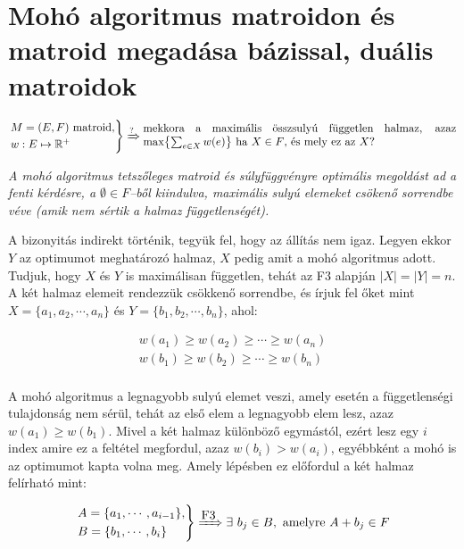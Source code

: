 \section{Mohó algoritmus matroidon és matroid megadása bázissal, duális matroidok}

\[
	\begin{rcases}
		M=(E,F) \mbox{ matroid}, \\
		w : E \mapsto \mathbb{R}^+
	\end{rcases}
	\xRightarrow{?} \parbox[L]{9.8cm}{mekkora a maximális összsulyú független halmaz,
		azaz max$\left\{\sum_{e \in X}w(e)\right\}$ ha $X \in F$, és mely ez az $X$?}
\]

\vspace{0.4cm}
\emph{A mohó algoritmus tetszőleges matroid és súlyfüggvényre optimális
	megoldást ad a fenti kérdésre, a $\emptyset \in F$--ből kiindulva, maximális
	sulyú elemeket csökenő sorrendbe véve (amik nem sértik a halmaz
	függetlenségét).}
\vspace{0.4cm}

A bizonyitás indirekt történik, tegyük fel, hogy az állítás nem igaz. Legyen
ekkor $Y$ az optimumot meghatározó halmaz, $X$ pedig amit a mohó algoritmus adott. Tudjuk,
hogy $X$ és $Y$ is maximálisan független, tehát az F$3$ alapján $|X|=|Y|=n$. A
két halmaz elemeit rendezzük csökkenő sorrendbe, és írjuk fel őket mint
$X=\{a_1, a_2, \cdots, a_n\}$ és $Y=\{b_1, b_2, \cdots, b_n\}$, ahol:

\begin{align*}
	w(a_1) \geq w(a_2) \geq \cdots \geq w(a_n) \\
	w(b_1) \geq w(b_2) \geq \cdots \geq w(b_n) \\
\end{align*}

A mohó algoritmus a legnagyobb sulyú elemet veszi, amely esetén a
függetlenségi tulajdonság nem sérül, tehát az első elem a legnagyobb elem lesz,
azaz $w(a_1) \geq w(b_1)$. Mivel a két halmaz különböző egymástól, ezért lesz
egy $i$ index amire ez a feltétel megfordul, azaz $ w(b_i)> w(a_i)$, egyébbként
a mohó is az optimumot kapta volna meg. Amely lépésben ez előfordul a két halmaz
felírható mint:

\[
	\begin{rcases}
		A=\{a_1, \cdots, a_{i-1}\}, \\
		B=\{b_1, \cdots, b_{i}\}
	\end{rcases}
	\xRightarrow{\mbox{F3}} \exists~b_j \in B, \mbox{ amelyre } A + b_j \in F
\]

